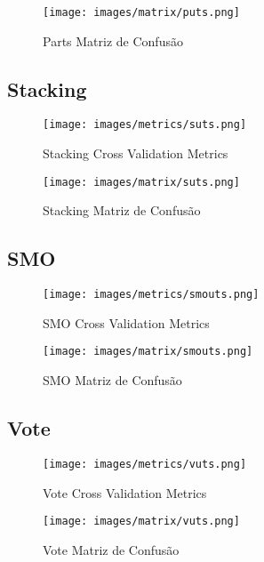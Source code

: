 \begin{figure}[H]
  \centering
  \texttt{[image: images/matrix/puts.png]}
  \caption{Parts Matriz de Confusão}
  \label{fig:p_uts_matrix}
\end{figure}

\subsection{Stacking}

\begin{figure}[H]
  \centering
  \texttt{[image: images/metrics/suts.png]}
  \caption{Stacking Cross Validation Metrics}
  \label{fig:s_uts_metrics}
\end{figure}

\begin{figure}[H]
  \centering
  \texttt{[image: images/matrix/suts.png]}
  \caption{Stacking Matriz de Confusão}
  \label{fig:s_uts_matrix}
\end{figure}

\subsection{SMO}

\begin{figure}[H]
  \centering
  \texttt{[image: images/metrics/smouts.png]}
  \caption{SMO Cross Validation Metrics}
  \label{fig:smo_uts_metrics}
\end{figure}

\begin{figure}[H]
  \centering
  \texttt{[image: images/matrix/smouts.png]}
  \caption{SMO Matriz de Confusão}
  \label{fig:smo_uts_matrix}
\end{figure}

\subsection{Vote}

\begin{figure}[H]
  \centering
  \texttt{[image: images/metrics/vuts.png]}
  \caption{Vote Cross Validation Metrics}
  \label{fig:v_uts_metrics}
\end{figure}

\begin{figure}[H]
  \centering
  \texttt{[image: images/matrix/vuts.png]}
  \caption{Vote Matriz de Confusão}
  \label{fig:v_uts_matrix}
\end{figure}
